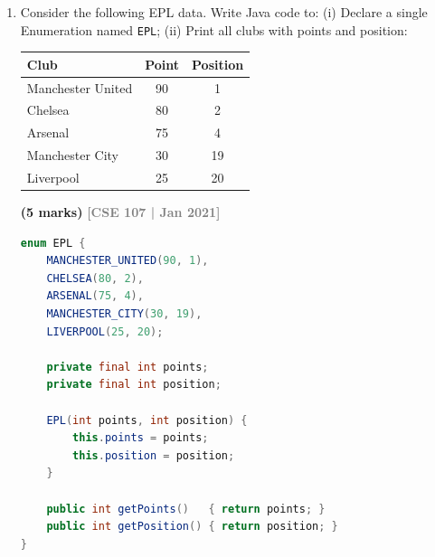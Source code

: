 \documentclass[12pt,a3paper]{article}
\newcommand{\yr}[1]{\hfill\textcolor{gray}{\small\textbf{[#1]}}}
\newcommand{\mk}[1]{\textcolor{orange!70!black}{\small\textbf{(#1 marks)}}}
\begin{document}
\begin{enumerate}
\begin{tcolorbox}[enhanced,breakable,ansbox,
  colback=cH!4,colframe=cH,boxrule=0.8pt,arc=5pt,
  title={\textbf{Answer --- \texttt{FWCWinners} Enumeration}},
  fonttitle=\bfseries\color{white},colbacktitle=cH]
\begin{lstlisting}[language=Java]
        System.out.println("\nMost recent winner: " + recent.name()
            + " (" + recent.getLastTitle() + ")");
    }
}
\end{lstlisting}

\textbf{Output:}
\begin{lstlisting}
All FIFA World Cup Winners:
ARGENTINA | Titles: 3 | Last: 2022
FRANCE | Titles: 2 | Last: 2018
URUGUAY | Titles: 2 | Last: 1950
ENGLAND | Titles: 1 | Last: 1966
SPAIN | Titles: 1 | Last: 2010

Most recent winner: ARGENTINA (2022)
\end{lstlisting}

\end{tcolorbox}

\item Consider the following EPL data. Write Java code to: (i) Declare a single Enumeration named \texttt{EPL}; (ii) Print all clubs with points and position:
\begin{center}
\begin{tabular}{lcc}
\toprule
\textbf{Club} & \textbf{Point} & \textbf{Position}\\
\midrule
Manchester United & 90 & 1 \\
Chelsea & 80 & 2 \\
Arsenal & 75 & 4 \\
Manchester City & 30 & 19 \\
Liverpool & 25 & 20 \\
\bottomrule
\end{tabular}
\end{center}
\mk{5}
\yr{CSE 107 | Jan 2021}

\begin{tcolorbox}[enhanced,breakable,ansbox,
  colback=cH!4,colframe=cH,boxrule=0.8pt,arc=5pt,
  title={\textbf{Answer --- \texttt{EPL} Enumeration}},
  fonttitle=\bfseries\color{white},colbacktitle=cH]

\begin{lstlisting}[language=Java]
enum EPL {
    MANCHESTER_UNITED(90, 1),
    CHELSEA(80, 2),
    ARSENAL(75, 4),
    MANCHESTER_CITY(30, 19),
    LIVERPOOL(25, 20);

    private final int points;
    private final int position;

    EPL(int points, int position) {
        this.points = points;
        this.position = position;
    }

    public int getPoints()   { return points; }
    public int getPosition() { return position; }
}


\end{lstlisting}
\end{tcolorbox}
\end{enumerate}
\end{document}
